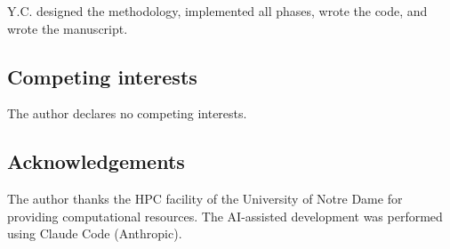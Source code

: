 \documentclass[12pt,a4paper]{article}
\begin{document}
Y.C. designed the methodology, implemented all phases, wrote the code, and wrote the manuscript.
\subsection*{Competing interests}

The author declares no competing interests.

\subsection*{Acknowledgements}

The author thanks the HPC facility of the University of Notre Dame for providing computational resources. The AI-assisted development was performed using Claude Code (Anthropic).
\end{document}
